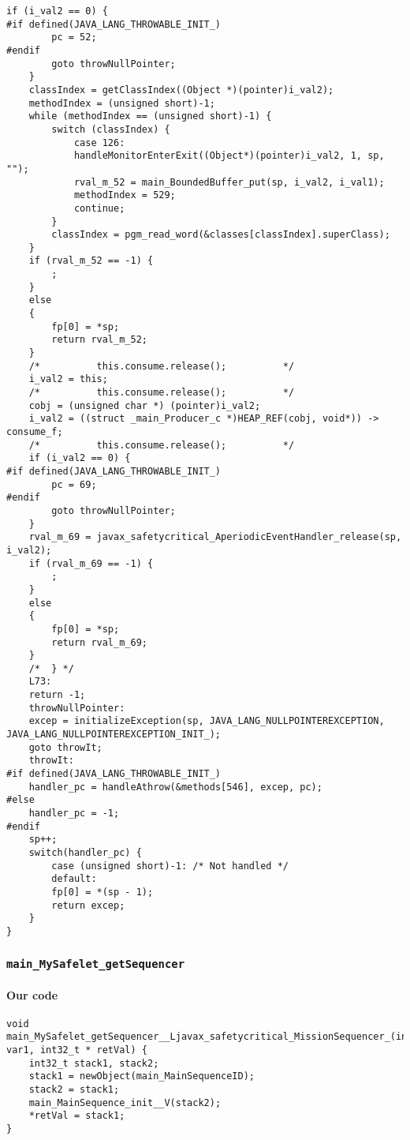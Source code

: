 \begin{lstlisting}[firstnumber=56910]
	if (i_val2 == 0) {
#if defined(JAVA_LANG_THROWABLE_INIT_)
		pc = 52;
#endif
		goto throwNullPointer;
	}
	classIndex = getClassIndex((Object *)(pointer)i_val2);
	methodIndex = (unsigned short)-1;
	while (methodIndex == (unsigned short)-1) {
		switch (classIndex) {
			case 126:
			handleMonitorEnterExit((Object*)(pointer)i_val2, 1, sp, "");
			rval_m_52 = main_BoundedBuffer_put(sp, i_val2, i_val1);
			methodIndex = 529;
			continue;
		}
		classIndex = pgm_read_word(&classes[classIndex].superClass);
	}
	if (rval_m_52 == -1) {
		;
	}
	else
	{
		fp[0] = *sp;
		return rval_m_52;
	}
	/*			this.consume.release();			 */
	i_val2 = this;
	/*			this.consume.release();			 */
	cobj = (unsigned char *) (pointer)i_val2;
	i_val2 = ((struct _main_Producer_c *)HEAP_REF(cobj, void*)) -> consume_f;
	/*			this.consume.release();			 */
	if (i_val2 == 0) {
#if defined(JAVA_LANG_THROWABLE_INIT_)
		pc = 69;
#endif
		goto throwNullPointer;
	}
	rval_m_69 = javax_safetycritical_AperiodicEventHandler_release(sp, i_val2);
	if (rval_m_69 == -1) {
		;
	}
	else
	{
		fp[0] = *sp;
		return rval_m_69;
	}
	/*	} */
	L73:
	return -1;
	throwNullPointer:
	excep = initializeException(sp, JAVA_LANG_NULLPOINTEREXCEPTION, JAVA_LANG_NULLPOINTEREXCEPTION_INIT_);
	goto throwIt;
	throwIt:
#if defined(JAVA_LANG_THROWABLE_INIT_)
	handler_pc = handleAthrow(&methods[546], excep, pc);
#else
	handler_pc = -1;
#endif
	sp++;
	switch(handler_pc) {
		case (unsigned short)-1: /* Not handled */
		default:
		fp[0] = *(sp - 1);
		return excep;
	}
}
\end{lstlisting}

\subsubsection{\texttt{main\_MySafelet\_getSequencer}}

\paragraph{Our code}\hfill
\begin{lstlisting}[firstnumber=1710]
void main_MySafelet_getSequencer__Ljavax_safetycritical_MissionSequencer_(int32_t var1, int32_t * retVal) {
	int32_t stack1, stack2;
	stack1 = newObject(main_MainSequenceID);
	stack2 = stack1;
	main_MainSequence_init__V(stack2);
	*retVal = stack1;
}
\end{lstlisting}

